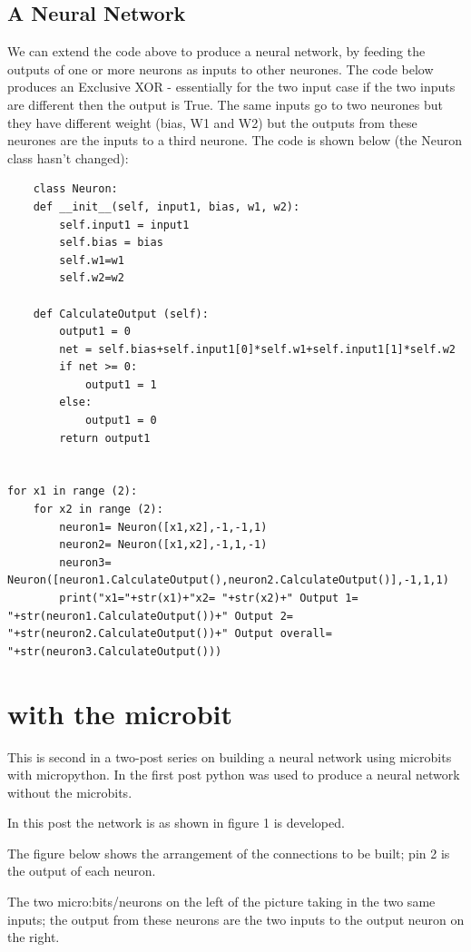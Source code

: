 \subsection{A Neural Network}
We can extend the code above to produce a neural network, by feeding the outputs of one or more neurons as inputs to other neurones. The code below produces an Exclusive XOR - essentially for the two input case if the two inputs are different then the output is True. The same inputs go to two neurones but they have different weight (bias, W1 and W2) but the outputs from these neurones are the inputs to a third neurone. The code is shown below (the Neuron class hasn't changed):
\begin{verbatim}
    class Neuron:
    def __init__(self, input1, bias, w1, w2):
        self.input1 = input1
        self.bias = bias
        self.w1=w1
        self.w2=w2
    
    def CalculateOutput (self):
        output1 = 0
        net = self.bias+self.input1[0]*self.w1+self.input1[1]*self.w2
        if net >= 0:
            output1 = 1
        else:
            output1 = 0
        return output1


for x1 in range (2):
    for x2 in range (2):
        neuron1= Neuron([x1,x2],-1,-1,1)
        neuron2= Neuron([x1,x2],-1,1,-1)
        neuron3= Neuron([neuron1.CalculateOutput(),neuron2.CalculateOutput()],-1,1,1)
        print("x1="+str(x1)+"x2= "+str(x2)+" Output 1= "+str(neuron1.CalculateOutput())+" Output 2= "+str(neuron2.CalculateOutput())+" Output overall= "+str(neuron3.CalculateOutput()))
\end{verbatim}


        



\section{with the microbit}
This is second in a two-post series on building a neural network using microbits with micropython. 
In the first post python was used to produce a neural network without the microbits. 

In this post the network is as shown in figure 1 is developed.

The figure below shows the arrangement of the connections to be built; pin 2 is the output of each neuron. 

The two micro:bits/neurons on the left of the picture taking in the two same inputs; the output from these neurons are the two inputs to the output neuron on the right.

